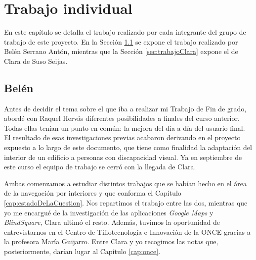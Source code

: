 \chapter{Trabajo individual}
\label{cap:trabajoIndiv}

En este capítulo se detalla el trabajo realizado por cada integrante del grupo de trabajo de este proyecto. En la Sección \ref{sec:trabajoBelen} se expone el trabajo realizado por Belén Serrano Antón, mientras que la Sección \ref{sec:trabajoClara} expone el de Clara de Suso Seijas.

\section{Belén}
\label{sec:trabajoBelen}

Antes de decidir el tema sobre el que iba a realizar mi Trabajo de Fin de grado, abordé con Raquel Hervás diferentes posibilidades a finales del curso anterior. Todas ellas tenían un punto en común: la mejora del día a día del usuario final. El resultado de esas investigaciones previas acabaron derivando en el proyecto expuesto a lo largo de este documento, que tiene como finalidad la adaptación del interior de un edificio a personas con discapacidad visual. Ya en septiembre de este curso el equipo de trabajo se cerró con la llegada de Clara.

Ambas comenzamos a estudiar distintos trabajos que se habían hecho en el área de la navegación por interiores y que conforma el Capítulo \ref{cap:estadoDeLaCuestion}. Nos repartimos el trabajo entre las dos, mientras que yo me encargué de la investigación de las aplicaciones \textit{Google Maps} y \textit{BlindSquare}, Clara ultimó el resto. Además, tuvimos la oportunidad de entrevistarnos en el Centro de Tiflotecnología e Innovación de la ONCE gracias a la profesora María Guijarro. Entre Clara y yo recogimos las notas que, posteriormente, darían lugar al Capítulo \ref{cap:once}.

